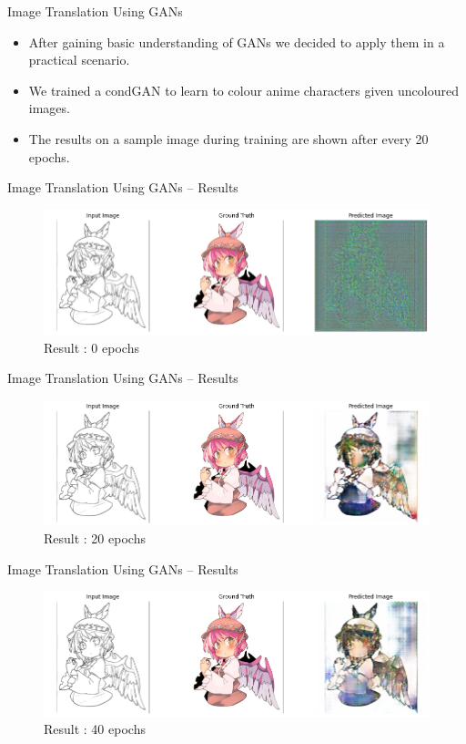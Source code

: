 \documentclass[handout]{beamer}
\begin{document}
\begin{frame}{Image Translation Using GANs}
     \begin{itemize}
        \item After gaining basic understanding of GANs we decided to apply them in a practical scenario. \pause 
        \item We trained a condGAN to learn to colour anime characters given uncoloured images. \pause
        \item The results on a sample image during training are shown after every 20 epochs.
    \end{itemize}
\end{frame}
\begin{frame}{Image Translation Using GANs -- Results}
     \begin{figure}[h]
        \centering
        \includegraphics[scale = 0.35]{0ep.png}
        \caption{Result : 0 epochs}
    \end{figure}
\end{frame}
\begin{frame}{Image Translation Using GANs -- Results}
     \begin{figure}[h]
        \centering
        \includegraphics[scale = 0.35]{20ep.png}
        \caption{Result : 20 epochs}
    \end{figure}
\end{frame}
\begin{frame}{Image Translation Using GANs -- Results}
     \begin{figure}[h]
        \centering
        \includegraphics[scale = 0.35]{40ep.png}
        \caption{Result : 40 epochs}
    \end{figure}
\end{frame}
\end{document}
